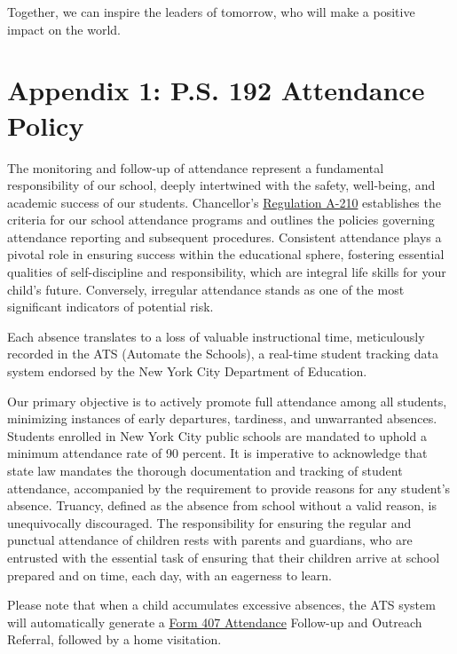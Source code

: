 \documentclass[letterpaper, 11pt]{article}
\begin{document}
Together, we can inspire the leaders of tomorrow, who will make a positive impact on the world.

\newpage

\section{Appendix 1: P.S. 192 Attendance Policy}
\label{apendixA}
The monitoring and follow-up of attendance represent a fundamental responsibility of our school, deeply intertwined with the safety, well-being, and academic success of our students. Chancellor’s \href{https://www.schools.nyc.gov/docs/default-source/default-document-library/a-210-english.pdf}{Regulation A-210} establishes the criteria for our school attendance programs and outlines the policies governing attendance reporting and subsequent procedures. Consistent attendance plays a pivotal role in ensuring success within the educational sphere, fostering essential qualities of self-discipline and responsibility, which are integral life skills for your child’s future. Conversely, irregular attendance stands as one of the most significant indicators of potential risk.

Each absence translates to a loss of valuable instructional time, meticulously recorded in the ATS (Automate the Schools), a real-time student tracking data system endorsed by the New York City Department of Education.

Our primary objective is to actively promote full attendance among all students, minimizing instances of early departures, tardiness, and unwarranted absences. Students enrolled in New York City public schools are mandated to uphold a minimum attendance rate of 90 percent. It is imperative to acknowledge that state law mandates the thorough documentation and tracking of student attendance, accompanied by the requirement to provide reasons for any student’s absence. Truancy, defined as the absence from school without a valid reason, is unequivocally discouraged. The responsibility for ensuring the regular and punctual attendance of children rests with parents and guardians, who are entrusted with the essential task of ensuring that their children arrive at school prepared and on time, each day, with an eagerness to learn.

Please note that when a child accumulates excessive absences, the ATS system will automatically generate a \href{https://www.schools.nyc.gov/docs/default-source/default-document-library/a-210-english.pdf}{Form 407 Attendance} Follow-up and Outreach Referral, followed by a home visitation.
\end{document}
